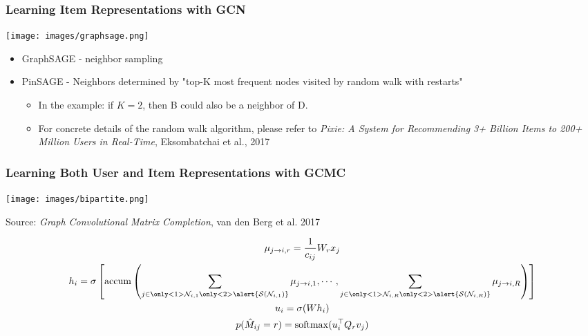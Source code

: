 \documentclass[11pt,aspectratio=169]{beamer}
\begin{document}
	\begin{frame}
		\frametitle{Learning Item Representations with GCN}
		\begin{center}
			\centering
			\texttt{[image: images/graphsage.png]}
		\end{center}
		\begin{itemize}
			\item<1-> GraphSAGE - neighbor sampling
			\item<2-> PinSAGE - Neighbors determined by "top-K most frequent nodes visited by random walk with restarts"
			\begin{itemize}
				\item<3-> In the example: if $K=2$, then \textcolor{B}{B} could also be a neighbor of \textcolor{D}{D}.
				\item<4-> For concrete details of the random walk algorithm, please refer to \textit{Pixie: A System for Recommending 3+ Billion Items to 200+ Million Users in Real-Time}, Eksombatchai et al., 2017
			\end{itemize}
		\end{itemize}
	\end{frame}

	\begin{frame}
		\frametitle{Learning Both User and Item Representations with GCMC}
		\begin{center}
			\centering
			\texttt{[image: images/bipartite.png]}
			
			{\tiny Source: \textit{Graph Convolutional Matrix Completion}, van den Berg et al. 2017}
		\end{center}
			$$
			\begin{gathered}
			\mu_{j \to i, r} = \dfrac{1}{c_{ij}} W_r x_j\\
			h_i = \sigma \left[\mathrm{accum}\left(
			\sum_{j \in \only<1>{\mathcal{N}_{i,1}}\only<2>{\alert{\mathcal{S}(\mathcal{N}_{i,1})}}} \mu_{j \to i, 1},
			\cdots,
			\sum_{j \in \only<1>{\mathcal{N}_{i,R}}\only<2>{\alert{\mathcal{S}(\mathcal{N}_{i,R})}}} \mu_{j \to i, R}
			\right) \right] \\
			u_i = \sigma(W h_i)\\
			p(\hat{M}_{ij}=r) = \mathrm{softmax}(u_i^\top Q_r v_j)
			\end{gathered}
			$$
	\end{frame}
\end{document}

